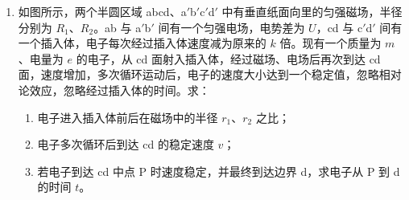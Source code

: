 \documentclass[\gkver]{gaokaozhenti}
\begin{document}
\begin{enumerate}
{整个过程由能量守恒得电动机消耗的总电能转化为物块增加的机械能和摩擦产生的内能，故可知 $E_{2} = E_{1} + \mu mg\cos\theta\cdot L$

故可得 $\frac{E_{1}}{E_{2}} = \frac{mgL\sin\theta}{mgL\sin\theta + \mu mgL\cos\theta} = \frac{\sin\theta}{\sin\theta + \mu\cos\theta}$
}

\item
如图所示，两个半圆区域 abcd、a$'$b$'$c$'$d$'$ 中有垂直纸面向里的匀强磁场，半径分别为 $R_{1}$、$R_{2}$。ab 与 a$'$b$'$ 间有一个匀强电场，电势差为 $U$，cd 与 c$'$d$'$ 间有一个插入体，电子每次经过插入体速度减为原来的 $k$ 倍。现有一个质量为 $m$、电量为 $e$ 的电子，从 cd 面射入插入体，经过磁场、电场后再次到达 cd 面，速度增加，多次循环运动后，电子的速度大小达到一个稳定值，忽略相对论效应，忽略经过插入体的时间。求：
\begin{enumerate}
	\item
	电子进入插入体前后在磁场中的半径 $r_{1}$、$r_{2}$ 之比；
	\item
	电子多次循环后到达 cd 的稳定速度 $v$；
	\item
	若电子到达 cd 中点 P 时速度稳定，并最终到达边界 d，求电子从 P 到 d 的时间 $t$。
\end{enumerate}
\end{enumerate}
\end{document}

